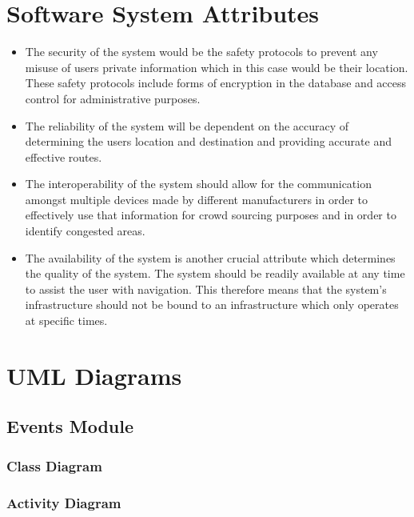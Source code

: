 \documentclass{article}
\begin{document}
	\clearpage
	
	\section{Software System Attributes}\label{sec:design-constraints}
		\begin{itemize}
		\small
		\item The security of the system would be the safety protocols to prevent any misuse of users private information which in this case would be their location. These safety protocols include forms of encryption in the database and access control for administrative purposes.
		\item The reliability of the system will be dependent on the accuracy of determining the users location and destination and providing accurate and effective routes.
		\item The interoperability of the system should allow for the communication amongst multiple devices made by different manufacturers in order to effectively use that information for crowd sourcing purposes and in order to identify congested areas.
		\item The availability of the system is another crucial attribute which determines the quality of the system. The system should be readily available at any time to assist the user with navigation. This therefore means that the system’s infrastructure should not be bound to an infrastructure which only operates at specific times.
		\end{itemize}
			

	\clearpage
	
	\section{UML Diagrams}\label{sec:uml-diagrams}
	
		
		\subsection{Events Module}\label{subsec:uml-diagrams-events}
		
		
			\subsubsection{Class Diagram}\label{subsec:uml-diagrams-events-class}
			
			
			\subsubsection{Activity Diagram}\label{subsec:uml-diagrams-events-act}
			
\end{document}
